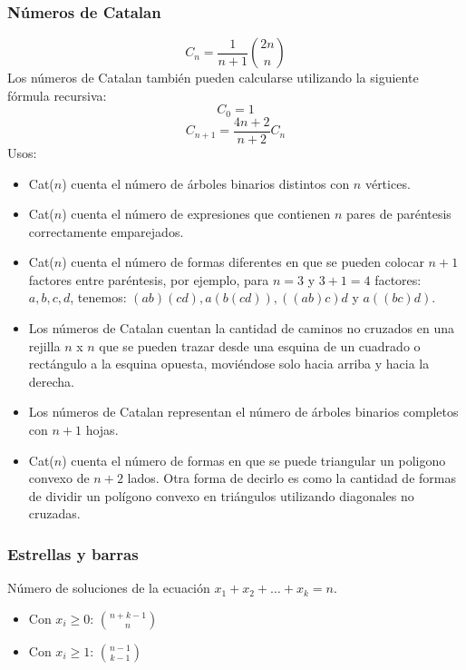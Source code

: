 \subsubsection{Números de Catalan}
\[ C_n = \frac{1}{n+1} \binom{2n}{n} \]
Los números de Catalan también pueden calcularse utilizando la siguiente fórmula recursiva:
\[ C_0 = 1 \]
\[ C_{n+1} = \frac{4n+2}{n+2} C_n \]
Usos:
\begin{itemize}
    \item  Cat($n$) cuenta el número de árboles binarios distintos con $n$ vértices.

    \item  Cat($n$) cuenta el número de expresiones que contienen $n$ pares de paréntesis correctamente emparejados.

    \item  Cat($n$) cuenta el número de formas diferentes en que se pueden colocar $n+1$ factores entre paréntesis, por ejemplo, para $n=3$ y $3+1=4$ factores: ${a, b, c, d}$, tenemos: $(ab)(cd), a(b(cd)), ((ab)c)d$ y $a((bc)d)$.
    
    \item  Los números de Catalan cuentan la cantidad de caminos no cruzados en una rejilla $n$ x $n$ que se pueden trazar desde una esquina de un cuadrado o rectángulo a la esquina opuesta, moviéndose solo hacia arriba y hacia la derecha.
    
    \item  Los números de Catalan representan el número de árboles binarios completos con $n+1$ hojas.
    
    \item  Cat($n$) cuenta el número de formas en que se puede triangular un poligono convexo de $n+2$ lados. Otra forma de decirlo es como la cantidad de formas de dividir un polígono convexo en triángulos utilizando diagonales no cruzadas.
    
\end{itemize}

\subsubsection{Estrellas y barras}

Número de soluciones de la ecuación \(x_1 + x_2 + \dots + x_k = n\).

\begin{itemize}
    \item Con \(x_i \ge 0\): \(\binom{n+k-1}{n}\)
    \item Con \(x_i \ge 1\): \(\binom{n-1}{k-1}\)
\end{itemize}

